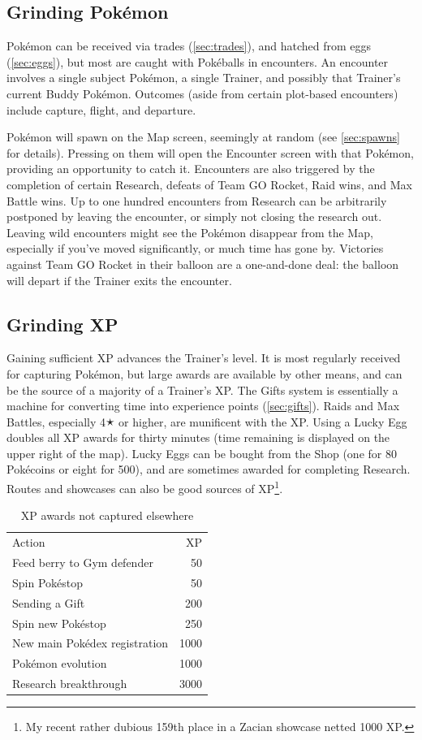 \subsection{Grinding Pokémon\label{subsec:getmons}}
Pokémon can be received via trades (\autoref{sec:trades}),
  and hatched from eggs (\autoref{sec:eggs}),
  but most are caught with Pokéballs in encounters.
An encounter involves a single subject Pokémon, a single Trainer,
  and possibly that Trainer's current Buddy Pokémon.
Outcomes (aside from certain plot-based encounters) include capture, flight, and departure.

Pokémon will spawn on the Map screen, seemingly at random (see \autoref{sec:spawns} for details).
Pressing on them will open the Encounter screen with that Pokémon,
  providing an opportunity to catch it.
Encounters are also triggered by the completion of certain Research,
  defeats of Team GO Rocket, Raid wins, and Max Battle wins.
Up to one hundred encounters from Research can be arbitrarily postponed by leaving the encounter,
  or simply not closing the research out.
Leaving wild encounters might see the Pokémon disappear from the Map, especially
  if you've moved significantly, or much time has gone by.
Victories against Team GO Rocket in their balloon are a one-and-done deal:
  the balloon will depart if the Trainer exits the encounter.

\subsection{Grinding XP\label{subsec:getxp}}
Gaining sufficient XP advances the Trainer's level.
It is most regularly received for capturing Pokémon, but large awards are
  available by other means, and can be the source of a majority of a Trainer's XP.
The Gifts system is essentially a machine for converting
  time into experience points (\autoref{sec:gifts}).
Raids and Max Battles, especially 4🟉 or higher, are munificent with the XP.
Using a Lucky Egg doubles all XP awards for thirty minutes (time remaining is displayed on the upper right of the map).
Lucky Eggs can be bought from the Shop (one for 80 Pokécoins or eight for 500),
  and are sometimes awarded for completing Research.
Routes and showcases can also be good sources of XP\footnote{My recent rather dubious 159th place in a Zacian showcase netted 1000 XP\@.}.

\begin{table}
\centering
\begin{tabular}{lr}
Action & XP\\
\Midrule
  Feed berry to Gym defender & 50\\
  Spin Pokéstop & 50\\
  Sending a Gift & 200\\
  Spin new Pokéstop & 250\\
  New main Pokédex registration & 1000\\
  Pokémon evolution & 1000\\
  Research breakthrough & 3000\\
\end{tabular}
\caption{XP awards not captured elsewhere\label{table:xpawards}}
\end{table}

